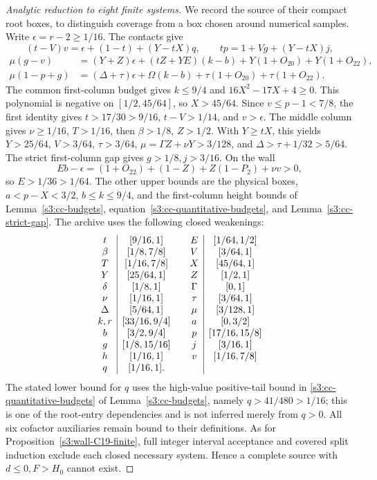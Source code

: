 \documentclass[11pt,reqno]{amsart}
\theoremstyle{definition}
\theoremstyle{remark}
\begin{document}
\begin{proof}[Analytic reduction to eight finite systems]
We record the source of their compact root boxes, to distinguish
coverage from a box chosen around numerical samples. Write
\(\epsilon=r-2\ge1/16\). The contacts give
\[
 (t-V)v=\epsilon+(1-t)+(Y-tX)q,\qquad
 tp=1+Vg+(Y-tX)j,
\]
\[
\begin{split}
 \mu(g-v)&=(Y+Z)\epsilon+(tZ+YE)(k-b)
              +Y(1+O_{20})+Y(1+O_{22}),\\
 \mu(1-p+g)&=(\Delta+\tau)\epsilon+\Omega(k-b)
              +\tau(1+O_{20})+\tau(1+O_{22}).
\end{split}
\]
The common first-column budget gives \(k\le9/4\) and
\(16X^2-17X+4\ge0\). This polynomial is negative on
\([1/2,45/64]\), so \(X>45/64\).
Since \(v\le p-1<7/8\), the first identity gives
\(t>17/30>9/16\), \(t-V>1/14\), and \(v>\epsilon\).
The middle column gives \(\nu\ge1/16\), \(T>1/16\),
then \(\beta>1/8\), \(Z>1/2\).
With \(Y\ge tX\), this yields \(Y>25/64\), \(V>3/64\),
\(\tau>3/64\), \(\mu=\Gamma Z+\nu Y>3/128\), and
\(\Delta>\tau+1/32>5/64\).
The strict first-column gap gives \(g>1/8,j>3/16\).
On the wall
\[
 Eb-\epsilon=(1+O_{22})+(1-Z)+Z(1-P_2)+\nu v>0,
\]
so \(E>1/36>1/64\). The other upper bounds are the physical
boxes, \(a<p-X<3/2\), \(b\le k\le9/4\), and the first-column
height bounds of Lemma~\ref{s3:cc-budgets}, equation~\eqref{s3:cc-quantitative-budgets},
and Lemma~\ref{s3:cc-strict-gap}. The archive uses the following closed weakenings:
\[
\begin{array}{c|c@{\qquad}c|c}
 t&[9/16,1]&E&[1/64,1/2]\\
 \beta&[1/8,7/8]&V&[3/64,1]\\
 T&[1/16,7/8]&X&[45/64,1]\\
 Y&[25/64,1]&Z&[1/2,1]\\
 \delta&[1/8,1]&\Gamma&[0,1]\\
 \nu&[1/16,1]&\tau&[3/64,1]\\
 \Delta&[5/64,1]&\mu&[3/128,1]\\
 k,r&[33/16,9/4]&a&[0,3/2]\\
 b&[3/2,9/4]&p&[17/16,15/8]\\
 g&[1/8,15/16]&j&[3/16,1]\\
 h&[1/16,1]&v&[1/16,7/8]\\
 q&[1/16,1].&&
\end{array}
\]
The stated lower bound for \(q\) uses the high-value
positive-tail bound in \eqref{s3:cc-quantitative-budgets} of Lemma~\ref{s3:cc-budgets}, namely \(q>41/480>1/16\); this is one of the
root-entry dependencies and is not inferred merely from \(q>0\).
All six cofactor auxiliaries remain bound to their definitions.
As for Proposition~\ref{s3:wall-C19-finite}, full integer interval
acceptance and covered split induction exclude each closed necessary
system. Hence a complete source with \(d\le0,F>H_0\) cannot exist.
\end{proof}
\end{document}

